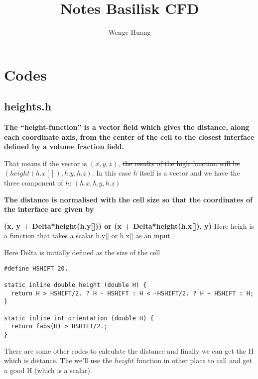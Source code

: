 \documentclass[12pt]{article} %
\title{Notes Basilisk CFD}
\author{Wenge Huang}
\begin{document}
\maketitle

\section{Codes}
\subsection{heights.h}
\hspace{5mm}
\textbf{
The “height-function” is a vector field which gives the distance, along each coordinate axis, from the center of the cell to the closest interface defined by a volume fraction field. }\par

That means if the vector is $(x, y ,z)$, \st{the results of the high function will be $(height(h.x[]), h.y, h.z)$}. In this case $h$ itself is a vector and we have the three component of $h$: $(h.x, h.y, h.z)$\par
\textbf{The distance is normalised with the cell size so that the coordinates of the interface are given by}\par
\textbf{
(x, y + Delta*height(h.y[])) or (x + Delta*height(h.x[]), y)
}Here heigh is a function that takes a scalar h.y[] or h.x[] as an input.
\par 
Here Delta is initially defined as the size of the cell
\vspace{5mm}

\begin{lstlisting}[style=CStyle]
#define HSHIFT 20.

static inline double height (double H) {
  return H > HSHIFT/2. ? H - HSHIFT : H < -HSHIFT/2. ? H + HSHIFT : H;
}

static inline int orientation (double H) {
  return fabs(H) > HSHIFT/2.;
}
\end{lstlisting}
\par
There are some other codes to calculate the distance and finally we can get the H which is distance. The we'll use the $height$ function in other place to call and get a good H (which is a scalar). 
\end{document}
